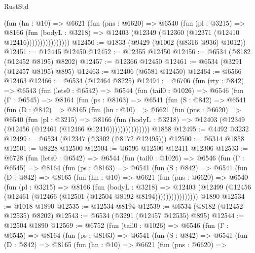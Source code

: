 \begin{lexlean}{RustStd}
\begin{coremodule}
                    (fun (hn : @10) =>
                    @6621
                      (fun (pns : @6620) =>
                      @6540
                        (fun (pl : @3215) =>
                        @8166
                          (fun (bodyL : @3218) =>
                          @12403 (@12349 (@12360 (@12371 (@12410 @12416))))))))))))))))
@12450 := @1833 (@9429 (@1002 (@8316 @936) @1012))
@12451 := @12445 @12450
@12452 := @12355 @12450
@12456 := @6534 (@8182 (@12452 @8195) @8202)
@12457 := @12366 @12450
@12461 := @6534 (@3291 (@12457 @8195) @895)
@12463 := @12406 (@6581 @12450)
@12464 := @6566 @12463
@12466 := @6534 (@12464 @8225)
@12494 := @6706
    (fun (rty : @842) =>
    @6543
      (fun (lets0 : @6542) =>
      @6544
        (fun (tail0 : @1026) =>
        @6546
          (fun (Γ : @6545) =>
          @8164
            (fun (ps : @8163) =>
            @6541
              (fun (S : @842) =>
              @6541
                (fun (D : @842) =>
                @8165
                  (fun (hn : @10) =>
                  @6621
                    (fun (pns : @6620) =>
                    @6540
                      (fun (pl : @3215) =>
                      @8166
                        (fun (bodyL : @3218) =>
                        @12403 (@12349 (@12456 (@12461 (@12466 @12416)))))))))))))))
    @1858
@12495 := @4492 @3232
@12499 := @6534 (@12347 (@3302 (@8172 @12495)))
@12500 := @5314 @1858
@12501 := @8228 @12500
@12504 := @6596 @12500 @12411 @12306
@12533 := @6728
    (fun (lets0 : @6542) =>
    @6544
      (fun (tail0 : @1026) =>
      @6546
        (fun (Γ : @6545) =>
        @8164
          (fun (ps : @8163) =>
          @6541
            (fun (S : @842) =>
            @6541
              (fun (D : @842) =>
              @8165
                (fun (hn : @10) =>
                @6621
                  (fun (pns : @6620) =>
                  @6540
                    (fun (pl : @3215) =>
                    @8166
                      (fun (bodyL : @3218) =>
                      @12403
                        (@12499 (@12456 (@12461 (@12466 (@12501 (@12504 @8192 @8194))))))))))))))))
    @1890
@12534 := @1018 @1890
@12535 := @12534 @8194
@12539 := @6534 (@8182 (@12452 @12535) @8202)
@12543 := @6534 (@3291 (@12457 @12535) @895)
@12544 := @12504 @1890
@12569 := @6752
    (fun (tail0 : @1026) =>
    @6546
      (fun (Γ : @6545) =>
      @8164
        (fun (ps : @8163) =>
        @6541
          (fun (S : @842) =>
          @6541
            (fun (D : @842) =>
            @8165
              (fun (hn : @10) =>
              @6621
                (fun (pns : @6620) =>

\end{coremodule}
\end{lexlean}
